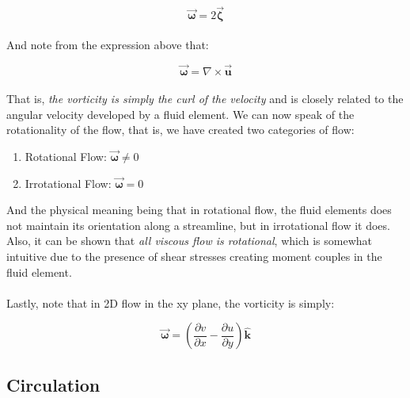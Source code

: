 \documentclass[11pt]{article}
\begin{document}
\begin{equation*}
    \vec{\bm{\omega}} = 2\vec{\bm{\zeta}}
\end{equation*} \\ 
\noindent
And note from the expression above that:

\begin{equation*}
    \vec{\bm{\omega}} = \nabla \times \vec{\bm{u}}
\end{equation*}\\
\noindent
That is, \emph{the vorticity is simply the curl of the velocity} and is closely related to the angular velocity developed by a fluid element. We can now speak of the rotationality of the flow, that is, we have created two categories of flow:

\begin{enumerate}
    \item Rotational Flow: $\vec{\bm{\omega}} \neq 0$
    \item Irrotational Flow: $\vec{\bm{\omega}} = 0$
\end{enumerate}
\noindent
And the physical meaning being that in rotational flow, the fluid elements does not maintain its orientation along a streamline, but in irrotational flow it does. Also, it can be shown that \emph{all viscous flow is rotational}, which is somewhat intuitive due to the presence of shear stresses creating moment couples in the fluid element. \\ \\
\noindent
Lastly, note that in 2D flow in the xy plane, the vorticity is simply:

\begin{equation*}
    \vec{\bm{\omega}} = \left( \frac{\partial v}{\partial x} - \frac{\partial u}{\partial y} \right) \hat{\bm{k}}
\end{equation*}

\subsection{Circulation}
\end{document}
